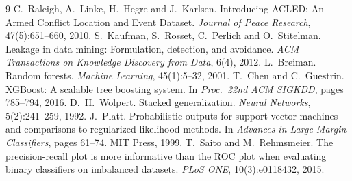 \documentclass[11pt,a4paper]{article}
\begin{document}
\begin{thebibliography}{9}\small
{} C.~Raleigh, A.~Linke, H.~Hegre and J.~Karlsen. Introducing ACLED: An Armed Conflict Location and Event Dataset. \emph{Journal of Peace Research}, 47(5):651--660, 2010.
 S.~Kaufman, S.~Rosset, C.~Perlich and O.~Stitelman. Leakage in data mining: Formulation, detection, and avoidance. \emph{ACM Transactions on Knowledge Discovery from Data}, 6(4), 2012.
 L.~Breiman. Random forests. \emph{Machine Learning}, 45(1):5--32, 2001.
 T.~Chen and C.~Guestrin. XGBoost: A scalable tree boosting system. In \emph{Proc.\ 22nd ACM SIGKDD}, pages 785--794, 2016.
 D.~H.~Wolpert. Stacked generalization. \emph{Neural Networks}, 5(2):241--259, 1992.
 J.~Platt. Probabilistic outputs for support vector machines and comparisons to regularized likelihood methods. In \emph{Advances in Large Margin Classifiers}, pages 61--74. MIT Press, 1999.
 T.~Saito and M.~Rehmsmeier. The precision-recall plot is more informative than the ROC plot when evaluating binary classifiers on imbalanced datasets. \emph{PLoS ONE}, 10(3):e0118432, 2015.
\end{thebibliography}
\end{document}
